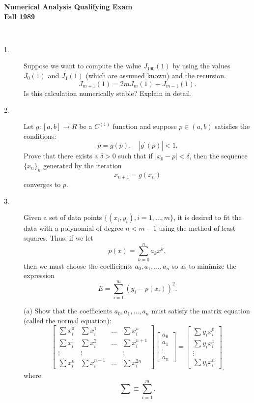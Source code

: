 \documentclass{article}
\begin{document}






\begin{center}\begin{LARGE}
{\bf Numerical Analysis Qualifying Exam}\\ 
{\bf Fall 1989}\\ \end{LARGE}
\end{center}
\vspace{0.1in}
\noindent\hrulefill\\

\begin{description}
\item[1.]
Suppose we want to compute the value $J_{100}(1)$ by using the values
$J_0(1)$ and $J_1(1)$ (which are assumed known) and the recursion.
$$J_{m+1}(1) = 2mJ_m (1) - J_{m-1} (1).$$
Is this calculation numerically stable? Explain in detail.

\item[2.]
Let $g:[a,b] \to R$ be a $C^{(1)}$ function and suppose $p \in (a,b)$
satisfies the conditions:
$$p=g(p), \quad |g^\prime (p)| < 1.$$
Prove that there exists a $\delta > 0$ such that if $|x_0 - p| < \delta$,
then the sequence $\{x_n\}_n$ generated by the iteration
$$x_{n+1} = g(x_n)$$
converges to $p$.

\item[3.]
Given a set of data points $\{(x_i, y_i), i =1, \dots, m\}$, it is desired to
fit the data with a polynomial of degree $n < m-1$ using the method of least
squares. Thus, if we let
$$p(x) = \sum^n_{k=0} a_kx^k,$$
then we must choose the coefficients $a_0, a_1, \dots, a_n$ so as to
minimize the expression
$$E= \sum^m_{i=1} (y_i - p(x_i))^2.$$

\item[\quad] (a)
Show that the coefficients $a_0, a_1, \dots, a_n$ must satisfy the matrix
equation (called the normal equation):
$$\left[\begin{array}{cccc}
        \sum x^0_i & \sum x^1_i & \dots & \sum x^n_i \\
        \sum x^1_i & \sum x^2_i & \dots & \sum x^{n+1}_i \\
        \vdots & \vdots & & \vdots \\
        \sum x^n_i & \sum x^{n+1}_i & \dots & \sum x^{2n}_i
        \end{array}
        \right]
  \left[\begin{array} {c}
        a_0 \\
        a_1 \\
        \vdots \\
        a_n
        \end{array} \right] =
   \left[\begin{array} {c}
        \sum y_i x^0_i \\
        \sum y_i x^1_i \\
        \vdots \\
        \sum y_i x^n_i
        \end{array} \right]_,$$
where
$$\sum \equiv \sum^m_{i=1}.$$


\end{description}
\end{document}

